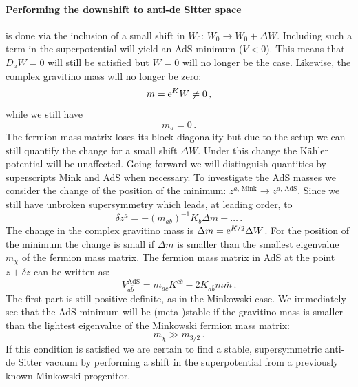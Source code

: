 \documentclass[a4paper,12pt]{report}
\newcommand{\be}{\begin{equation}}
\newcommand{\ee}{\end{equation}}
\def\rme{{\rm e}}
\begin{document}
\paragraph{Performing the downshift to anti-de Sitter space} is done via the inclusion of a small shift in $W_0$: $W_0 \to W_0 +\Delta W$. Including such a term in the superpotential will yield an AdS minimum ($V<0$). This means that $D_aW=0$ will still be satisfied but $W=0$ will no longer be the case. Likewise, the complex gravitino mass will no longer be zero:
\be 
m = \rme^K W \neq 0\,,
\ee 
while we still have 
\be 
m_a = 0\,.
\ee
The fermion mass matrix loses its block diagonality but due to the setup we can still quantify the change for a small shift $\Delta W$. Under this change the Kähler potential will be unaffected. Going forward we will distinguish quantities by superscripts Mink and AdS when necessary. To investigate the AdS masses we consider the change of the position of the minimum: $z^{a,\,\text{Mink}} \to z^{a,\,\text{AdS}}$. Since we still have unbroken supersymmetry which leads, at leading order, to
\be 
\delta z^a = - (m_{ab})^{-1} K_b \Delta m + \ldots\,.
\ee
The change in the complex gravitino mass is $\Delta m = \rme^{K/2} \Delta W$. For the position of the minimum the change is small if $\Delta m$ is smaller than the smallest eigenvalue $m_\chi$ of the fermion mass matrix. The fermion mass matrix in AdS at the point $z + \delta z$ can be written as:
\be 
V_{a\bar{b}}^{\text{AdS}}=m_{ac}K^{c\bar{c}}-2K_{a\bar{b}} m \bar{m}\,.
\ee
The first part is still positive definite, as in the Minkowski case. We immediately see that the AdS minimum will be (meta-)stable if the gravitino mass is smaller than the lightest eigenvalue of the Minkowski fermion mass matrix:
\be 
m_{\chi} \gg m_{3/2}\,.
\ee
If this condition is satisfied we are certain to find a stable, supersymmetric anti-de Sitter vacuum by performing a shift in the superpotential from a previously known Minkowski progenitor.
\end{document}
